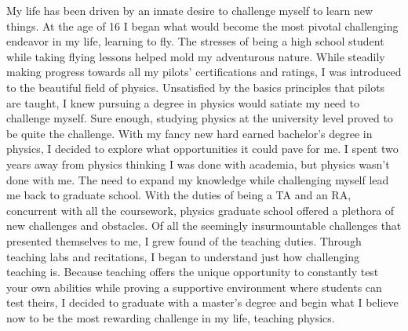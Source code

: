 \documentclass[11pt, a4paper]{awesome-cv} %
\begin{document}
\makecvheader %



\makelettertitle %

\vspace{0pt}


\begin{cvletter}



\hspace{10pt} My life has been driven by an innate desire to challenge myself to learn new things.  At the age of 16 I began what would become the most pivotal challenging endeavor in my life, learning to fly.  The stresses of being a high school student while taking flying lessons helped mold my adventurous nature.  While steadily making progress towards all my pilots’ certifications and ratings, I was introduced to the beautiful field of physics.  Unsatisfied by the basics principles that pilots are taught, I knew pursuing a degree in physics would satiate my need to challenge myself.  Sure enough, studying physics at the university level proved to be quite the challenge.  With my fancy new hard earned bachelor’s degree in physics, I decided to explore what opportunities it could pave for me.  I spent two years away from physics thinking I was done with academia, but physics wasn’t done with me.  The need to expand my knowledge while challenging myself lead me back to graduate school.  With the duties of being a TA and an RA, concurrent with all the coursework, physics graduate school offered a plethora of new challenges and obstacles.  Of all the seemingly insurmountable challenges that presented themselves to me, I grew found of the teaching duties.  Through teaching labs and recitations, I began to understand just how challenging teaching is.  Because teaching offers the unique opportunity to constantly test your own abilities while proving a supportive environment where students can test theirs, I decided to graduate with a master’s degree and begin what I believe now to be the most rewarding challenge in my life, teaching physics.



\end{cvletter}
\end{document}
